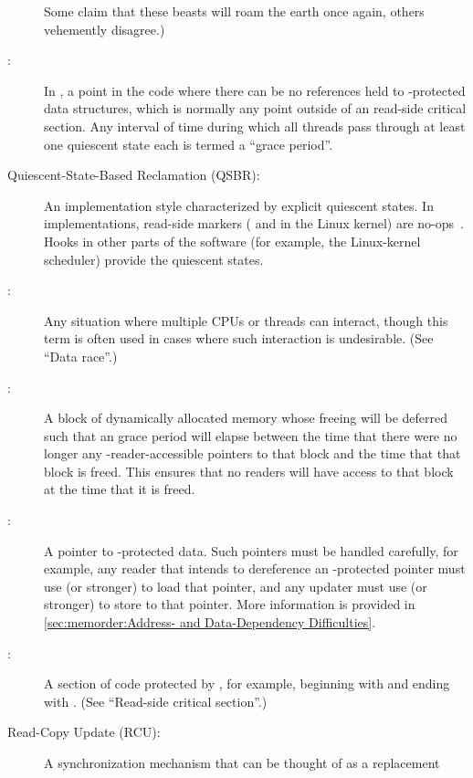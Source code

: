\begin{description}
	Some claim that these beasts will roam the earth once again,
	others vehemently disagree.)
\item[\IXG{Quiescent State}:]
	In , a point in the code where there can be no references held
	to -protected data structures, which is normally any point
	outside of an  read-side critical section.
	Any interval of time during which all threads pass through at
	least one quiescent state each is termed a ``grace period''.
\item[Quiescent-State-Based Reclamation (QSBR):]
	An  implementation style characterized by explicit quiescent
	states.
	In  implementations, read-side markers
	( and  in the Linux
	kernel) are no-ops~\cite{McKenney98,Slingwine95}.
	Hooks in other parts of the software (for example, the Linux-kernel
	scheduler) provide the quiescent states.
\item[\IXG{Race Condition}:]
	Any situation where multiple CPUs or threads can interact,
	though this term is often used in cases where such interaction
	is undesirable.
	(See ``Data race''.)
\item[\IXGaltr{RCU-Protected Data}{RCU-protected data}:]
	A block of dynamically allocated memory whose freeing will be
	deferred such that an  grace period will elapse between the
	time that there were no longer any -reader-accessible pointers
	to that block and the time that that block is freed.
	This ensures that no  readers will have access to that block at
	the time that it is freed.
\item[\IXGaltr{RCU-Protected Pointer}{RCU-protected pointer}:]
	A pointer to -protected data.
	Such pointers must be handled carefully, for example, any reader
	that intends to dereference an -protected pointer must
	use  (or stronger) to load that pointer,
	and any updater must use  (or stronger)
	to store to that pointer.
	More information is provided in
	\cref{sec:memorder:Address- and Data-Dependency Difficulties}.
\item[\IXGalthmr{RCU Read-Side Critical Section}{RCU read-side}{critical section}:]
	A section of code protected by , for example, beginning with
	 and ending with .
	(See ``Read-side critical section''.)
\item[Read-Copy Update (RCU):]
	A synchronization mechanism that can be thought of as a replacement

\end{description}
